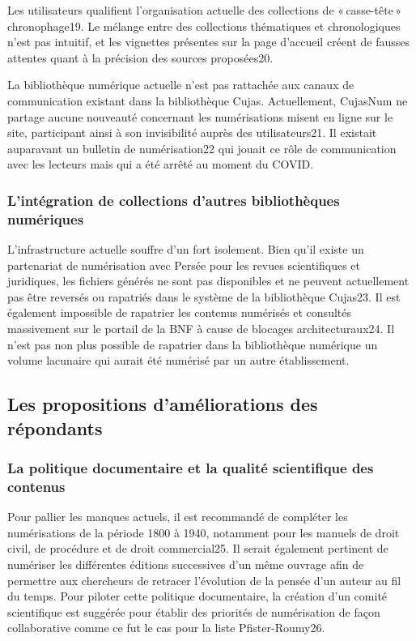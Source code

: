 Les utilisateurs qualifient l’organisation actuelle des collections de « casse-tête » chronophage19. Le mélange entre des collections thématiques et chronologiques n’est pas intuitif, et les vignettes présentes sur la page d’accueil créent de fausses attentes quant à la précision des sources proposées20.  

La bibliothèque numérique actuelle n’est pas rattachée aux canaux de communication existant dans la bibliothèque Cujas. Actuellement, CujasNum ne partage aucune nouveauté concernant les numérisations misent en ligne sur le site, participant ainsi à son invisibilité auprès des utilisateurs21. Il existait auparavant un bulletin de numérisation22 qui jouait ce rôle de communication avec les lecteurs mais qui a été arrêté au moment du COVID.   

\subsubsection{L’intégration de collections d’autres bibliothèques numériques} 

L’infrastructure actuelle souffre d’un fort isolement. Bien qu’il existe un partenariat de numérisation avec Persée pour les revues scientifiques et juridiques, les fichiers générés ne sont pas disponibles et ne peuvent actuellement pas être reversés ou rapatriés dans le système de la bibliothèque Cujas23. Il est également impossible de rapatrier les contenus numérisés et consultés massivement sur le portail de la BNF à cause de blocages architecturaux24. Il n’est pas non plus possible de rapatrier dans la bibliothèque numérique un volume lacunaire qui aurait été numérisé par un autre établissement. 

\subsection{Les propositions d’améliorations des répondants}

\subsubsection{La politique documentaire et la qualité scientifique des contenus}

Pour pallier les manques actuels, il est recommandé de compléter les numérisations de la période 1800 à 1940, notamment pour les manuels de droit civil, de procédure et de droit commercial25. Il serait également pertinent de numériser les différentes éditions successives d’un même ouvrage afin de permettre aux chercheurs de retracer l’évolution de la pensée d’un auteur au fil du temps. Pour piloter cette politique documentaire, la création d’un comité scientifique est suggérée pour établir des priorités de numérisation de façon collaborative comme ce fut le cas pour la liste Pfister-Roumy26.  


